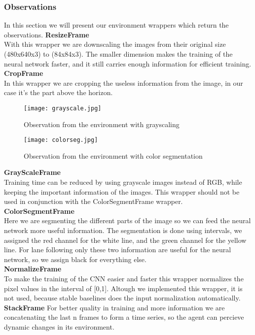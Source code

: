\documentclass{article}
\begin{document}
\subsubsection{\normalsize{Observations}}
In this section we will present our environment wrappers which return the observations.
\textbullet  \textbf{ResizeFrame}\\
With this wrapper we are downscaling the images from their original size (480x640x3) to (84x84x3). The smaller dimension makes the training of the neural network faster, and it still carries enough information for efficient training.\\
\textbullet  \textbf{CropFrame}\\
In this wrapper we are cropping the useless information from the image, in our case it's the part above the horizon.\\
\begin{figure}[h!]
	\centering
	\begin{minipage}{.5\textwidth}
	\centering
	\texttt{[image: grayscale.jpg]}
	\caption{Observation from the environment with grayscaling}
	\end{minipage}%
\begin{minipage}{.5\textwidth}
	\centering
	\texttt{[image: colorseg.jpg]}
	\caption{Observation from the environment with color segmentation}
\end{minipage}
\end{figure}
\textbullet  \textbf{GrayScaleFrame}\\
Training time can be reduced by using grayscale images instead of RGB, while keeping the important information of the images. This wrapper should not be used in conjunction with the ColorSegmentFrame wrapper.\\

\textbullet  \textbf{ColorSegmentFrame}\\
Here we are segmenting the different parts of the image so we can feed the neural network more useful information. The segmentation is done using intervals, we assigned the red channel for the white line, and the green channel for the yellow line. For lane following only these two information are useful for the neural network, so we assign black for everything else.\\
\textbullet  \textbf{NormalizeFrame}\\
To make the training of the CNN easier and faster this wrapper normalizes the pixel values in the interval of [0,1]. Altough we implemented this wrapper, it is not used, because stable baselines does the input normalization automatically.\\
\textbullet  \textbf{StackFrame}
For better quality in training and more information we are concatenating the last n frames to form a time series, so the agent can percieve dynamic changes in its environment.\\
\end{document}
